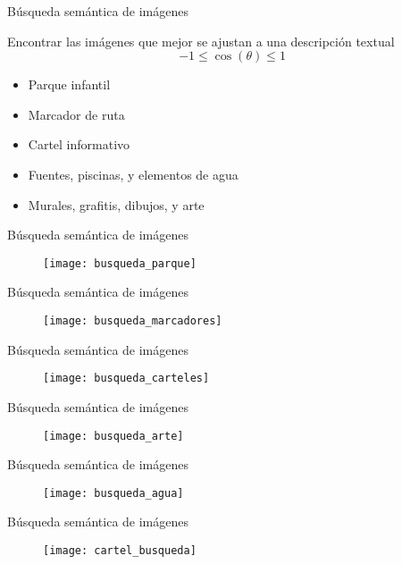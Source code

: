 \documentclass[aspectratio = 169]{beamer}
\begin{document}
			\begin{frame}{Búsqueda semántica de imágenes}
				\begin{block}{}
					Encontrar las imágenes que mejor se ajustan a una descripción textual
					$$
					-1\leq\cos(\theta)\leq 1
					$$
					\begin{itemize}
						\item Parque infantil
						\item Marcador de ruta
						\item Cartel informativo
						\item Fuentes, piscinas, y elementos de agua
						\item Murales, grafitis, dibujos, y arte
					\end{itemize}
				\end{block}
			\end{frame}
			\begin{frame}{Búsqueda semántica de imágenes}
				\begin{figure}
					\centering
					\texttt{[image: busqueda\_parque]}
				\end{figure} 
			\end{frame}
			\begin{frame}{Búsqueda semántica de imágenes}
				\begin{figure}
					\centering
					\texttt{[image: busqueda\_marcadores]}
				\end{figure} 
			\end{frame}
			\begin{frame}{Búsqueda semántica de imágenes}
				\begin{figure}
					\centering
					\texttt{[image: busqueda\_carteles]}
				\end{figure} 
			\end{frame}
			\begin{frame}{Búsqueda semántica de imágenes}
				\begin{figure}
					\centering
					\texttt{[image: busqueda\_arte]}
				\end{figure} 
			\end{frame}
			\begin{frame}{Búsqueda semántica de imágenes}
				\begin{figure}
					\centering
					\texttt{[image: busqueda\_agua]}
				\end{figure} 
			\end{frame}
			\begin{frame}{Búsqueda semántica de imágenes}
				\begin{figure}
					\centering
					\texttt{[image: cartel\_busqueda]}
				\end{figure} 
			\end{frame}	
	
\end{document}
